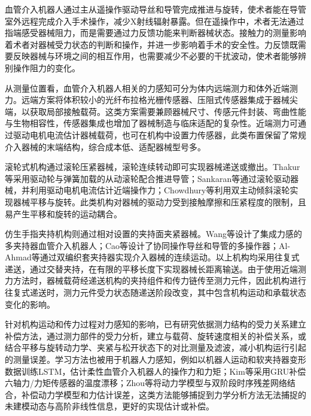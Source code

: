 \documentclass{JQR_LaTeX_Template-0507/JQRnew}
\begin{document}
\maketitle
\raggedbottom

\makeatletter
{}
\makeatother
血管介入机器人通过主从遥操作驱动导丝和导管完成推进与旋转，使术者能在导管室外远程完成介入手术操作，减少X射线辐射暴露。但在遥操作中，术者无法通过指端感受器械阻力，而是需要通过力反馈功能来判断器械状态。接触力的测量影响着术者对器械受力状态的判断和操作，并进一步影响着手术的安全性。力反馈既需要反映器械与环境之间的相互作用，也需要减少不必要的干扰波动，使术者能够辨别操作阻力的变化。

 从测量位置看，血管介入机器人相关的力感知可分为体内远端测力和体外近端测力。远端方案将体积较小的光纤布拉格光栅传感器、压阻式传感器集成于器械尖端，以获取局部接触载荷。这类方案需要兼顾器械尺寸、传感元件封装、弯曲性能与生物相容性，传感器集成也增加了器械制造与临床适配的复杂性。近端测力可通过驱动电机电流估计器械载荷，也可在机构中设置力传感器，此类布置保留了常规介入器械的末端结构，综合成本低、适配器械型号多。

滚轮式机构通过滚轮压紧器械，滚轮连续转动即可实现器械递送或撤出。Thakur等采用驱动轮与弹簧加载的从动滚轮配合推进导管；Sankaran等通过滚轮驱动器械，并利用驱动电机电流估计近端操作力；Chowdhury等利用双主动倾斜滚轮实现器械平移与旋转。此类机构对器械的驱动力受到接触摩擦和压紧程度的限制，且易产生平移和旋转的运动耦合。

仿生手指夹持机构则通过相对设置的夹持面夹紧器械。Wang等设计了集成力感的多夹持器血管介入机器人；Cao等设计了协同操作导丝和导管的多操作器；Al-Ahmad等通过双编织套夹持器实现介入器械的连续运动。以上机构均采用往复式递送，通过交替夹持，在有限的平移长度下实现器械长距离输送。由于使用近端测力方法时，器械载荷经递送机构的夹持组件和传力链传至测力元件，因此机构进行往复式递送时，测力元件受力状态随递送阶段改变，其中包含机构运动和承载状态变化的影响。

针对机构运动和传力过程对力感知的影响，已有研究依据测力结构的受力关系建立补偿方法，通过测力部件的受力分析，建立与载荷、旋转速度相关的补偿关系，或结合平移与旋转动力学、夹紧与松开状态下的对比测量及滤波，减小机构运行引起的测量误差。学习方法也被用于机器人力感知，例如以机器人运动和软夹持器变形数据训练LSTM，估计柔性血管介入机器人的操作力和力矩；Kim等采用GRU补偿六轴力/力矩传感器的温度漂移；Zhou等将动力学模型与双阶段时序残差网络结合，补偿动力学模型和力估计误差，这类方法能够捕捉到力学分析方法无法捕捉的未建模动态与高阶非线性信息，更好的实现估计或补偿。
\end{document}
